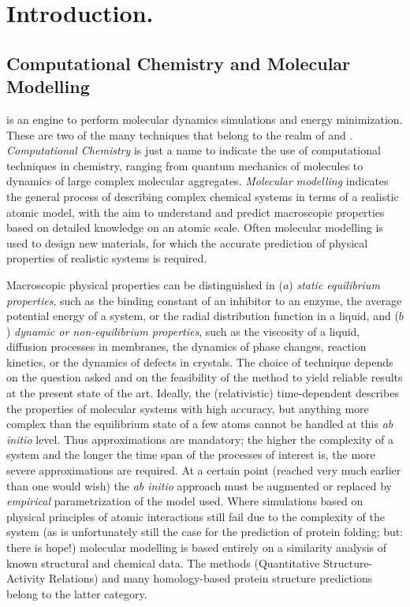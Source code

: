 \chapter{Introduction.}

\section{Computational Chemistry and Molecular Modelling}

\label{sec:Compchem}

{\gromacs} is an engine to perform molecular dynamics simulations and 
energy minimization. These are two of the many techniques that belong 
to the realm of  and 
. 
{\em Computational Chemistry} is just a name to indicate the use of 
computational techniques in chemistry, ranging from quantum mechanics 
of molecules to dynamics of large complex molecular aggregates. {\em 
Molecular modelling} indicates the general process of describing 
complex chemical systems in terms of a realistic atomic model, with the 
aim to understand and predict macroscopic properties based on detailed 
knowledge on an atomic scale. Often molecular modelling is used to 
design new materials, for which the accurate prediction of physical 
properties of realistic systems is required. 

Macroscopic physical properties can be distinguished in ($a$) {\em static 
equilibrium properties}, such as the binding constant  of an inhibitor to an 
enzyme, the average potential energy of a system, or the radial distribution  
function in a liquid, and ($b$) {\em
dynamic or non-equilibrium properties}, such as the viscosity of a 
liquid, diffusion processes in membranes, the dynamics of phase 
changes, reaction kinetics, or the dynamics of defects in crystals.  
The choice of technique depends on the question asked and on the 
feasibility of the method to yield reliable results at the present 
state of the art. Ideally, the (relativistic) time-dependent 
describes the properties of molecular systems 
with high accuracy, but anything more complex than the equilibrium 
state of a few atoms cannot be handled at this {\em ab initio} level. 
Thus approximations are mandatory; the higher the complexity of a 
system and the longer the time span of the processes of interest is, 
the more severe approximations are required. At a certain point 
(reached very much earlier than one would wish) the {\em ab initio} 
approach must be augmented or replaced by {\em empirical} 
parametrization of the model used. Where simulations based on physical 
principles of atomic interactions still fail  due to the complexity of the 
system (as is unfortunately 
still the case for the prediction of protein folding; but: there is hope!) 
molecular modelling is based entirely on a similarity analysis of known 
structural and chemical data. The  methods (Quantitative 
Structure-Activity Relations) and many homology-based protein structure  
predictions belong to the latter category.

